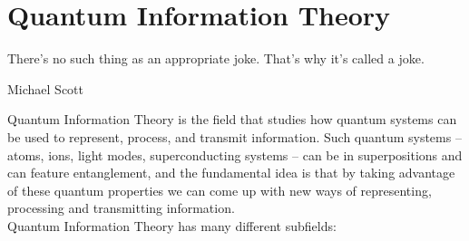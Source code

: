 
\chapter{Quantum Information Theory}

\epigraph{There’s no such thing as an appropriate joke. That’s why it’s called a joke.}{Michael Scott}

Quantum Information Theory is the field that studies how quantum systems can be used to represent, process, and transmit information.
Such quantum systems – atoms, ions, light modes, superconducting systems – can be in superpositions and can feature entanglement, 
and the fundamental idea is that by taking advantage of these quantum properties we can come up with new ways of representing, processing
and transmitting information.\\
Quantum Information Theory has many different subfields:

